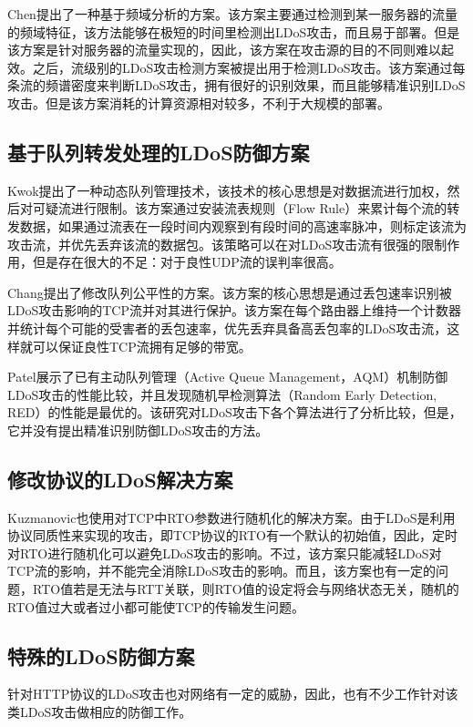 Chen\cite{b3}提出了一种基于频域分析的方案。该方案主要通过检测到某一服务器的流量的频域特征，该方法能够在极短的时间里检测出LDoS攻击，而且易于部署。但是该方案是针对服务器的流量实现的，因此，该方案在攻击源的目的不同则难以起效。之后，流级别的LDoS攻击检测方案\cite{chen2007spectral}被提出用于检测LDoS攻击。该方案通过每条流的频谱密度来判断LDoS攻击，拥有很好的识别效果，而且能够精准识别LDoS攻击。但是该方案消耗的计算资源相对较多，不利于大规模的部署。





\subsection{基于队列转发处理的LDoS防御方案}
\label{chap2:queanalysis}
Kwok\cite{b22}提出了一种动态队列管理技术，该技术的核心思想是对数据流进行加权，然后对可疑流进行限制。该方案通过安装流表规则（Flow Rule）来累计每个流的转发数据，如果通过流表在一段时间内观察到有段时间的高速率脉冲，则标定该流为攻击流，并优先丢弃该流的数据包。该策略可以在对LDoS攻击流有很强的限制作用，但是存在很大的不足：对于良性UDP流的误判率很高。

Chang\cite{b8}提出了修改队列公平性的方案。该方案的核心思想是通过丢包速率识别被LDoS攻击影响的TCP流并对其进行保护。该方案在每个路由器上维持一个计数器并统计每个可能的受害者的丢包速率，优先丢弃具备高丢包率的LDoS攻击流，这样就可以保证良性TCP流拥有足够的带宽。

Patel\cite{patel2016throughput}展示了已有主动队列管理（Active Queue Management，AQM）机制防御LDoS攻击的性能比较，并且发现随机早检测算法（Random Early Detection, RED）的性能是最优的。该研究对LDoS攻击下各个算法进行了分析比较，但是，它并没有提出精准识别防御LDoS攻击的方法。


\subsection{修改协议的LDoS解决方案}
\label{chap2:promodify}
Kuzmanovic\cite{Kuzmanovic2006Low}也使用对TCP中RTO参数进行随机化的解决方案。由于LDoS是利用协议同质性来实现的攻击，即TCP协议的RTO有一个默认的初始值，因此，定时对RTO进行随机化可以避免LDoS攻击的影响。不过，该方案只能减轻LDoS对TCP流的影响，并不能完全消除LDoS攻击的影响。而且，该方案也有一定的问题，RTO值若是无法与RTT关联，则RTO值的设定将会与网络状态无关，随机的RTO值过大或者过小都可能使TCP的传输发生问题。


\subsection{特殊的LDoS防御方案}
\label{chap2:special-LDoS-Defense}
针对HTTP协议的LDoS攻击也对网络有一定的威胁，因此，也有不少工作针对该类LDoS攻击做相应的防御工作。

